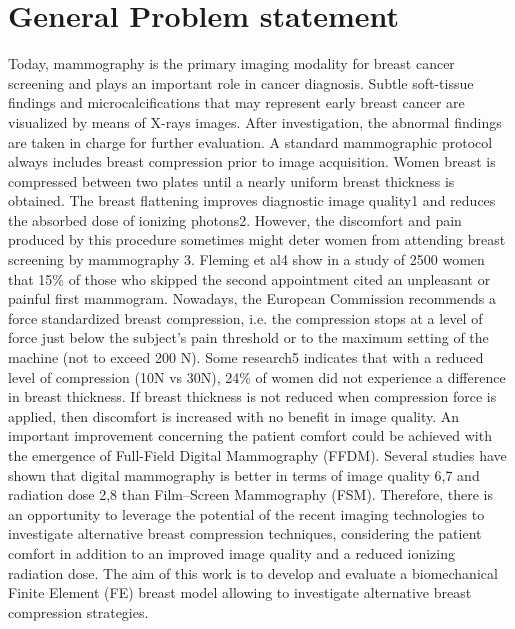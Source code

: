 \chapter*{General Problem statement}
\label{section:generalproblemstatment}
Today, mammography is the primary imaging modality for breast cancer screening and plays an important role in cancer diagnosis. Subtle soft-tissue findings and microcalcifications that may represent early breast cancer are visualized by means of X-rays images. After investigation, the abnormal findings are taken in charge for further evaluation.  
A standard mammographic protocol always includes breast compression prior to image acquisition. Women breast is compressed between two plates until a nearly uniform breast thickness is obtained. The breast flattening improves diagnostic image quality1 and reduces the absorbed dose of ionizing photons2. However, the discomfort and pain produced by this procedure sometimes might deter women from attending breast screening by mammography 3. Fleming et al4 show in a study of 2500 women that 15\% of those who skipped the second appointment cited an unpleasant or painful first mammogram. 
Nowadays, the European Commission recommends a force standardized breast compression, i.e. the compression stops at a level of force just below the subject’s pain threshold or to the maximum setting of the machine (not to exceed 200 N). Some research5 indicates that with a reduced level of compression (10N vs 30N), 24\% of women did not experience a difference in breast thickness. If breast thickness is not reduced when compression force is applied, then discomfort is increased with no benefit in image quality. 
An important improvement concerning the patient comfort could be achieved with the emergence of Full-Field Digital Mammography (FFDM).  Several studies have shown that digital mammography is better in terms of image quality 6,7 and radiation dose 2,8 than Film–Screen Mammography (FSM). Therefore, there is an opportunity to leverage the potential of the recent imaging technologies to investigate alternative breast compression techniques, considering the patient comfort in addition to an improved image quality and a reduced ionizing radiation dose. The aim of this work is to develop and evaluate a biomechanical Finite Element (FE) breast model allowing to investigate alternative breast compression strategies. 




